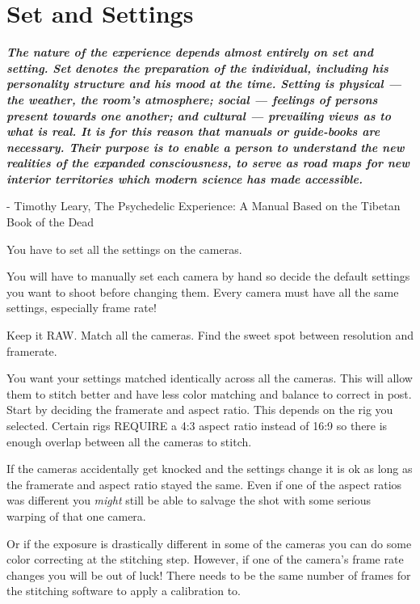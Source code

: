 \section{Set and Settings}
\pagecolor{white}
\label{chap:6}
\begin{fullwidth}

{\itshape\bfseries The nature of the experience depends almost entirely on set and setting. Set denotes the preparation of the individual, including his personality structure and his mood at the time. Setting is physical — the weather, the room’s atmosphere; social — feelings of persons present towards one another; and cultural — prevailing views as to what is real. It is for this reason that manuals or guide-books are necessary. Their purpose is to enable a person to understand the new realities of the expanded consciousness, to serve as road maps for new interior territories which modern science has made accessible.}

- Timothy Leary, The Psychedelic Experience: A Manual Based on the Tibetan Book of the Dead
\vspace{\baselineskip}

\problem

{\large You have to set all the settings on the cameras. \par}

You will have to manually set each camera by hand so decide the default settings you want to shoot before changing them. Every camera must have all the same settings, especially frame rate!

\solution

{\large Keep it RAW. Match all the cameras. Find the sweet spot between resolution and framerate. \par}

You want your settings matched identically across all the cameras. This will allow them to stitch better and have less color matching and balance to correct in post. Start by deciding the framerate and aspect ratio. This depends on the rig you selected. Certain rigs REQUIRE a 4:3 aspect ratio instead of 16:9 so there is enough overlap between all the cameras to stitch. 

If the cameras accidentally get knocked and the settings change it is ok as long as the framerate and aspect ratio stayed the same. Even if one of the aspect ratios was different you {\it might} still be able to salvage the shot with some serious warping of that one camera. 

Or if the exposure is drastically different in some of the cameras you can do some color correcting at the stitching step. However, if one of the camera’s frame rate changes you will be out of luck! There needs to be the same number of frames for the stitching software to apply a calibration to. 


\end{fullwidth}
